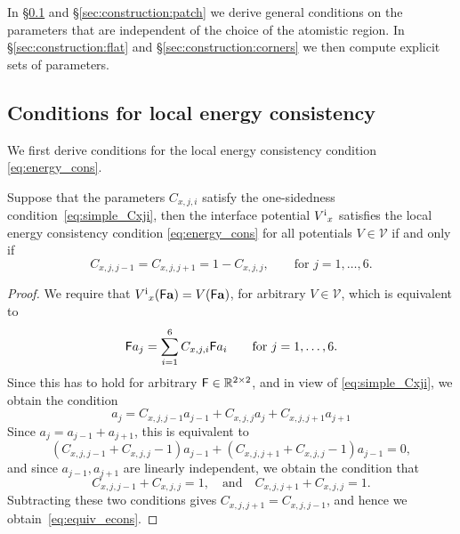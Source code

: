 \documentclass[12pt, reqno, a4paper]{amsart}
\numberwithin{equation}{section}
\numberwithin{theorem}{section}
\numberwithin{remark}{section}
\begin{document}
In \S\ref{sec:construction:e_cons} and \S\ref{sec:construction:patch}
we derive general conditions on the parameters that are independent of
the choice of the atomistic region. In \S\ref{sec:construction:flat}
and \S\ref{sec:construction:corners} we then compute explicit sets of
parameters.

\subsection{Conditions for local energy consistency}
\label{sec:construction:e_cons}
We first derive conditions for the local energy consistency condition
\eqref{eq:energy_cons}. 

\begin{proposition}
  \label{th:econs}
  Suppose that the parameters $C_{x,j,i}$ satisfy the one-sidedness
  condition~\eqref{eq:simple_Cxji}, then the interface potential
  ${V^{{\rm i}}}_x$ satisfies the local energy consistency condition
  \eqref{eq:energy_cons} for all potentials $V \in {\mathscr{V}}$ if and only if
  \begin{equation}
    \label{eq:equiv_econs}
    C_{x,j,j-1} = C_{x,j,j+1} = 1 - C_{x,j,j}, \qquad \text{for } j = 1, \dots, 6.
  \end{equation}
\end{proposition}
\begin{proof}
  We require that ${V^{{\rm i}}}_x({{\sf F}}{\bf a}) = V({{\sf F}}{\bf a})$, for arbitrary
  $V\in{\mathscr{V}}$, which is equivalent to
  \begin{displaymath}
    {{\sf F}} a_j = \sum_{i = 1}^6 C_{x,j,i} {{\sf F}} a_{i} \qquad \text{for } j =
    1, \dots, 6.
  \end{displaymath}
  Since this has to hold for arbitrary ${{\sf F}} \in {\mathbb{R}}^{2 \times 2}$, and
  in view of \eqref{eq:simple_Cxji}, we obtain the condition
  \begin{displaymath}
    a_j = C_{x,j,j-1} a_{j-1} + C_{x,j,j} a_j + C_{x, j, j+1} a_{j+1}
  \end{displaymath}
  Since $a_j = a_{j-1} + a_{j+1}$, this is equivalent to
  \begin{displaymath}
    (C_{x,j,j-1} + C_{x,j,j} - 1) a_{j-1} +     (C_{x,j,j+1} +
    C_{x,j,j} - 1) a_{j-1}  = 0,
  \end{displaymath}
  and since $a_{j-1}, a_{j+1}$ are linearly independent, we obtain the
  condition that
  \begin{displaymath}
    C_{x,j,j-1} + C_{x,j,j} = 1, \quad \text{and} \quad
    C_{x,j,j+1} + C_{x,j,j} = 1.    
  \end{displaymath}
  Subtracting these two conditions gives $C_{x,j,j+1} = C_{x,j,j-1}$,
  and hence we obtain~\eqref{eq:equiv_econs}.
\end{proof}
\end{document}

